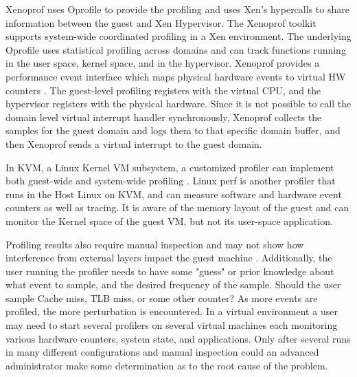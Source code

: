 \indent Xenoprof uses Oprofile to provide the profiling and uses Xen's hypercalls to share information between the guest and Xen Hypervisor.  The Xenoprof toolkit supports system-wide coordinated profiling in a Xen environment.  The underlying Oprofile uses statistical profiling across domains and can track functions running in the user space, kernel space, and in the hypervisor.  Xenoprof provides a performance event interface which maps physical hardware events to virtual HW counters \cite{santos, menon2}.   The guest-level profiling registers with the virtual CPU, and the hypervisor registers with the physical hardware.  Since it is not possible to call the domain level virtual interrupt handler synchronously, Xenoprof collects the samples for the guest domain and logs them to that specific domain buffer, and then Xenoprof sends a virtual interrupt to the guest domain.

\indent In KVM, a Linux Kernel VM subsystem, a customized profiler can implement both guest-wide and system-wide profiling \cite{du2}.  Linux perf is another profiler that runs in the Host Linux on KVM, and can measure software and hardware event counters as well as tracing.  It is aware of the memory layout of the guest and can monitor the Kernel space of the guest VM, but not its user-space application. 

\indent Profiling results also require manual inspection and may not show how interference from external layers impact the guest machine \cite{traeger, knapp1}.  Additionally, the user running the profiler needs to have some "guess" or prior knowledge about what event to sample, and the desired frequency of the sample.  Should the user sample Cache miss, TLB miss, or some other counter?  As more events are profiled, the more perturbation is encountered.  In a virtual environment a user may need to start several profilers on several virtual machines each monitoring various hardware counters, system state, and applications.  Only after several runs in many different configurations and manual inspection could an advanced administrator make some determination as to the root cause of the problem. 

